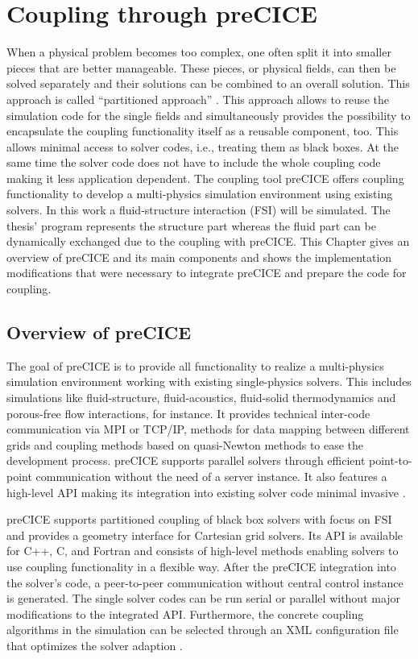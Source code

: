\section{Coupling through preCICE}
When a physical problem becomes too complex, one often split it into smaller pieces that are better manageable. These pieces, or physical fields, can then be solved separately and their solutions can be combined to an overall solution. This approach is called ``partitioned approach'' \cite{gatzhammer2015efficient}. This approach allows to reuse the simulation code for the single fields and simultaneously provides the possibility to encapsulate the coupling functionality itself as a reusable component, too. This allows minimal access to solver codes, i.e., treating them as black boxes. At the same time the solver code does not have to include the whole coupling code making it less application dependent. The coupling tool preCICE offers coupling functionality to develop a multi-physics simulation environment using existing solvers. In this work a fluid-structure interaction (FSI) will be simulated. The thesis' program represents the structure part whereas the fluid part can be dynamically exchanged due to the coupling with preCICE. This Chapter gives an overview of preCICE and its main components and shows the implementation modifications that were necessary to integrate preCICE and prepare the code for coupling.

 \subsection{Overview of preCICE} %
  The goal of preCICE is to provide all functionality to realize a multi-physics simulation environment working with existing single-physics solvers. This includes simulations like fluid-structure, fluid-acoustics, fluid-solid thermodynamics and porous-free flow interactions, for instance. It provides technical inter-code communication via MPI or TCP/IP, methods for data mapping between different grids and coupling methods based on quasi-Newton methods to ease the development process. preCICE supports parallel solvers through efficient point-to-point communication without the need of a server instance. It also features a high-level API making its integration into existing solver code minimal invasive \cite{bungartz2015fully}.
  
  preCICE supports partitioned coupling of black box solvers with focus on FSI and provides a geometry interface for Cartesian grid solvers. Its API is available for C++, C, and Fortran and consists of high-level methods enabling solvers to use coupling functionality in a flexible way. After the preCICE integration into the solver's code, a peer-to-peer communication without central control instance is generated. The single solver codes can be run serial or parallel without major modifications to the integrated API. Furthermore, the concrete coupling algorithms in the simulation can be selected through an XML configuration file that optimizes the solver adaption \cite{gatzhammer2015efficient}.
  
